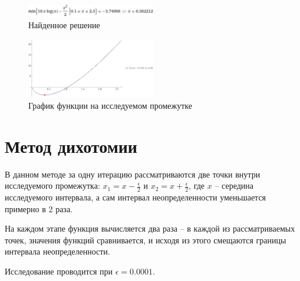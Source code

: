 \documentclass[12pt]{article}
\begin{document}
\begin{figure}[h]
\centering
\includegraphics[width=0.5\textwidth]{images/solution.jpeg}
\caption{Найденное решение}
\end{figure}

\begin{figure}[h]
\centering
\includegraphics[width=0.5\textwidth]{images/graphic.jpeg}
\caption{График функции на исследуемом промежутке}
\end{figure}

\newpage
\section{Метод дихотомии}

В данном методе за одну итерацию рассматриваются две точки внутри исследуемого промежутка: $x_1 = x - \frac{\epsilon}{2}$ и $x_2 = x + \frac{\epsilon}{2}$, где $x$ -- середина исследуемого интервала, а сам интервал неопределенности уменьшается примерно в 2 раза. 

На каждом этапе функция вычисляется два раза -- в каждой из рассматриваемых точек, значения функций сравнивается, и исходя из этого смещаются границы интервала неопределенности.

Исследование проводится при $\epsilon = 0.0001$.
\end{document}

